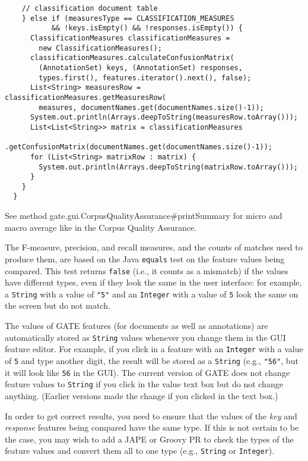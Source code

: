 \begin{lstlisting}
    // classification document table
    } else if (measuresType == CLASSIFICATION_MEASURES
           && !keys.isEmpty() && !responses.isEmpty()) {
      ClassificationMeasures classificationMeasures =
        new ClassificationMeasures();
      classificationMeasures.calculateConfusionMatrix(
        (AnnotationSet) keys, (AnnotationSet) responses,
        types.first(), features.iterator().next(), false);
      List<String> measuresRow = classificationMeasures.getMeasuresRow(
        measures, documentNames.get(documentNames.size()-1));
      System.out.println(Arrays.deepToString(measuresRow.toArray()));
      List<List<String>> matrix = classificationMeasures
        .getConfusionMatrix(documentNames.get(documentNames.size()-1));
      for (List<String> matrixRow : matrix) {
        System.out.println(Arrays.deepToString(matrixRow.toArray()));
      }
    }
  }
\end{lstlisting}

See method
{gate.gui.CorpusQualityAssurance\#printSummary} for micro and macro average
like in the Corpus Quality Assurance.

%
The F-measure, precision, and recall measures, and the counts of matches used to
produce them, are based on the Java \texttt{equals} test on the feature values
being compared.  This test returns \texttt{false} (i.e., it counts as a
mismatch) if the values have different types, even if they look the same in the
user interface: for example, a \texttt{String} with a value of \texttt{"5"} and
an \texttt{Integer} with a value of \texttt{5} look the same on the screen but
do not match.

The values of GATE features (for documents as well as annotations) are
automatically stored as \texttt{String} values whenever you change them in the
GUI feature editor.  For example, if you click in a feature with an
\texttt{Integer} with a value of \texttt{5} and type another digit, the result
will be stored as a \texttt{String} (e.g., \texttt{"56"}, but it will look like
\texttt{56} in the GUI).  The current version of GATE does not change feature
values to \texttt{String} if you click in the value text box but do not change
anything.  (Earlier versions made the change if you clicked in the text box.)

In order to get correct results, you need to ensure that the values of the
\emph{key} and \emph{response} features being compared have the same type.  If
this is not certain to be the case, you may wish to add a JAPE or Groovy PR to
check the types of the feature values and convert them all to one type (e.g.,
\texttt{String} or \texttt{Integer}).

